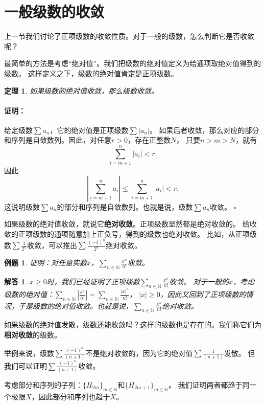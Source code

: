 \documentclass[12pt,UTF8]{ctexbook}
\renewenvironment{proof}{\paragraph{\textbf{证明：}}}{\hfill$\square$}
\newtheorem{tm}{定理}[section]
\newtheorem{et}{例题}[section]
\newtheorem*{so}{解答}
\begin{document}
\section{一般级数的收敛}
上一节我们讨论了正项级数的收敛性质。对于一般的级数，怎么判断它是否收敛呢？

最简单的方法是考虑“绝对值”。我们把级数的绝对值定义为给通项取绝对值得到的级数。
这样定义之下，级数的绝对值肯定是正项级数。

\begin{tm}
    如果级数的绝对值收敛，那么级数收敛。
\end{tm}

\begin{proof}
    给定级数$\sum a_n$，它的绝对值是正项级数$\sum |a_n|$。
    如果后者收敛，那么对应的部分和序列是自敛数列。因此，对任意$r>0$，存在正整数$N$，
    只要$n>m>N$，就有
    $$ \sum_{i=m+1}^n |a_i| < r. $$
    因此
    $$ \left|\sum_{i=m+1}^n a_i \right| \leqslant \sum_{i=m+1}^n |a_i| < r. $$
    这说明级数$\sum a_n$的部分和序列是自敛数列。也就是说，级数$\sum a_n$收敛。
\end{proof}

如果级数的绝对值收敛，就说它\textbf{绝对收敛}。正项级数显然都是绝对收敛的。
给收敛的正项级数的通项随意加上正负号，得到的级数也绝对收敛。
比如，从正项级数$\sum \frac{1}{2^n}$收敛，可以推出$\sum \frac{(-1)^{n}}{2^n}$绝对收敛。

\begin{et}
    证明：对任意实数$x$，$\sum_{n\in\mathbb{N}}\frac{x^{n}}{n!}$收敛。
\end{et}
\begin{so}
    $x\geqslant 0$时，我们已经证明了正项级数$\sum_{n\in\mathbb{N}}\frac{x^{n}}{n!}$收敛。
    对于一般的$x$，考虑级数的绝对值：$\sum_{n\in\mathbb{N}}\left|\frac{x^{n}}{n!}\right| = \sum_{n\in\mathbb{N}}\frac{|x|^{n}}{n!}$，
    $|x|\geqslant 0$，因此又回到了正项级数的情况，于是级数的绝对值收敛。也就是说，$\sum_{n\in\mathbb{N}}\frac{x^{n}}{n!}$绝对收敛。
\end{so}

如果级数的绝对值发散，级数还能收敛吗？这样的级数也是存在的。我们称它们为\textbf{相对收敛}的级数。

举例来说，级数$\sum \frac{(-1)^{n}}{(n+1)}$不是绝对收敛的，因为它的绝对值$\sum \frac{1}{(n+1)}$发散。
但我们可以证明$\sum \frac{(-1)^{n}}{(n+1)}$收敛。

考虑部分和序列的子列：$\{H_{2m}\}_{m\in\mathbb{N}}$和$\{H_{2m+1}\}_{m\in\mathbb{N}}$。
我们证明两者都趋于同一个极限$X$，因此部分和序列也趋于$X$。
\end{document}

